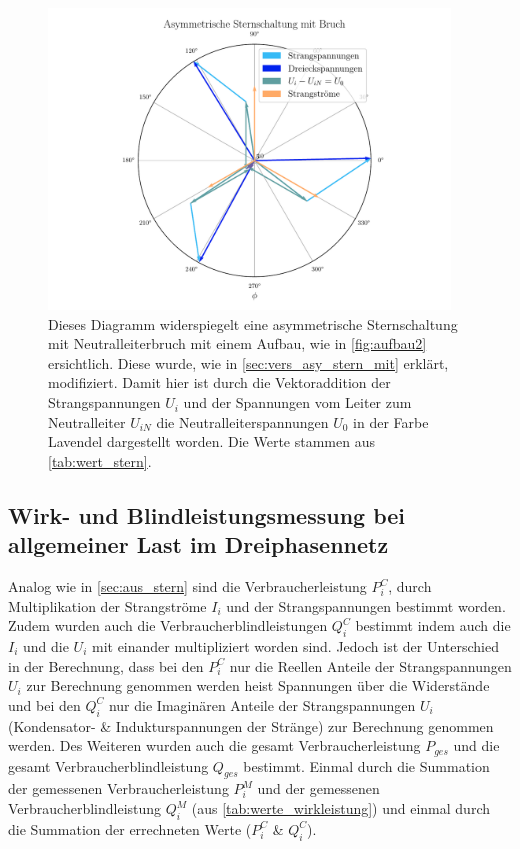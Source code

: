 \documentclass[12pt,english,ngerman]{scrartcl}
\begin{document}
\begin{figure}[H]
	\begin{center}
		\includegraphics[width = 0.95\textwidth]{figures/zeigerSternAsymBruch.pdf}
	\end{center}
	\caption[Zeigerdiagramm einer asymmetrisch ohmsch-belastete Sternschaltung mit
		Neutralleiterbruch]{Dieses Diagramm widerspiegelt eine asymmetrische
		Sternschaltung mit Neutralleiterbruch mit einem Aufbau, wie in
		\autoref{fig:aufbau2} ersichtlich. Diese wurde, wie in
		\autoref{sec:vers_asy_stern_mit} erklärt, modifiziert. Damit hier ist durch die
		Vektoraddition der Strangspannungen $U_i$ und der Spannungen vom Leiter zum
		Neutralleiter $U_{iN}$ die Neutralleiterspannungen $U_0$ in der Farbe Lavendel
		dargestellt worden. Die Werte stammen aus \autoref{tab:wert_stern}.
	}\label{fig:zeigerSternAsymBruch}
\end{figure}

\subsection{Wirk- und Blindleistungsmessung bei allgemeiner Last im Dreiphasennetz}

Analog wie in \autoref{sec:aus_stern} sind die Verbraucherleistung $P_i^C$,
durch Multiplikation der Strangströme $I_i$ und der Strangspannungen bestimmt
worden. Zudem wurden auch die Verbraucherblindleistungen $Q_i^C$ bestimmt indem
auch die $I_i$ und die $U_i$ mit einander multipliziert worden sind. Jedoch ist
der Unterschied in der Berechnung, dass bei den $P_i^C$ nur die Reellen Anteile
der Strangspannungen $U_i$ zur Berechnung genommen werden heist Spannungen über
die Widerstände und bei den $Q_i^C$ nur die Imaginären Anteile der
Strangspannungen $U_i$ (Kondensator- \& Indukturspannungen der Stränge) zur
Berechnung genommen werden. Des Weiteren wurden auch die gesamt
Verbraucherleistung $P_{ges}$ und die gesamt Verbraucherblindleistung $Q_{ges}$
bestimmt. Einmal durch die Summation der gemessenen Verbraucherleistung $P_i^M$
und der gemessenen Verbraucherblindleistung $Q_i^M$ (aus
\autoref{tab:werte_wirkleistung}) und einmal durch die Summation der
errechneten Werte ($P_i^C$ \& $Q_i^C$).
\end{document}
